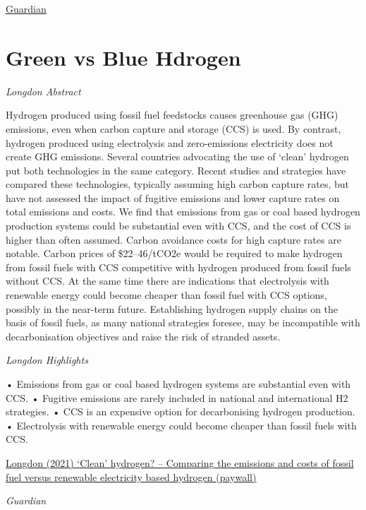 \documentclass[
]{book}
\begin{document}
\href{https://www.theguardian.com/environment/2021/oct/30/hydrogen-high-street-could-these-homes-change-the-way-we-keep-warm}{Guardian}

\hypertarget{green-vs-blue-hdrogen}{%
\section{Green vs Blue Hdrogen}\label{green-vs-blue-hdrogen}}

\emph{Longdon Abstract}

Hydrogen produced using fossil fuel feedstocks causes greenhouse gas (GHG) emissions, even when carbon capture and storage (CCS) is used. By contrast, hydrogen produced using electrolysis and zero-emissions electricity does not create GHG emissions. Several countries advocating the use of `clean' hydrogen put both technologies in the same category. Recent studies and strategies have compared these technologies, typically assuming high carbon capture rates, but have not assessed the impact of fugitive emissions and lower capture rates on total emissions and costs. We find that emissions from gas or coal based hydrogen production systems could be substantial even with CCS, and the cost of CCS is higher than often assumed. Carbon avoidance costs for high capture rates are notable. Carbon prices of \$22--46/tCO2e would be required to make hydrogen from fossil fuels with CCS competitive with hydrogen produced from fossil fuels without CCS. At the same time there are indications that electrolysis with renewable energy could become cheaper than fossil fuel with CCS options, possibly in the near-term future. Establishing hydrogen supply chains on the basis of fossil fuels, as many national strategies foresee, may be incompatible with decarbonisation objectives and raise the risk of stranded assets.

\emph{Longdon Highlights}

• Emissions from gas or coal based hydrogen systems are substantial even with CCS.
• Fugitive emissions are rarely included in national and international H2 strategies.
• CCS is an expensive option for decarbonising hydrogen production.
• Electrolysis with renewable energy could become cheaper than fossil fuels with CCS.

\href{https://www.sciencedirect.com/science/article/abs/pii/S0306261921014215}{Longdon (2021) `Clean' hydrogen? -- Comparing the emissions and costs of fossil fuel versus renewable electricity based hydrogen (paywall)}

\emph{Guardian}
\end{document}

